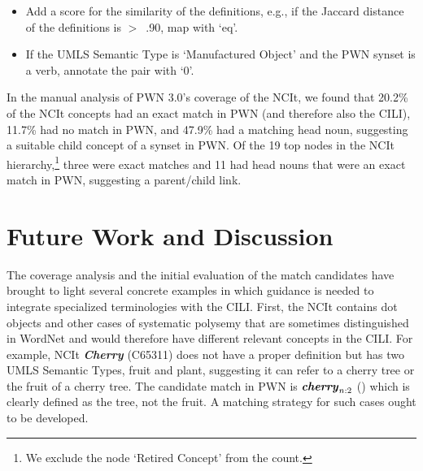 \documentclass[11pt]{article}
\newcommand{\lex}[1]{\textbf{\textit{#1}}}
\begin{document}
\begin{itemize}
\item Add a score for the similarity of the definitions, e.g., if the Jaccard distance of the definitions is $>$~.90, map with `eq'.
\item If the UMLS Semantic Type is `Manufactured Object' and the PWN synset is a verb, annotate the pair with `0'.
\end{itemize}



In the manual analysis of PWN 3.0's coverage of the NCIt, we found that 20.2\% of the NCIt concepts had an exact match in PWN (and therefore also the CILI), 11.7\% had no match in PWN, and 47.9\% had a matching head noun, suggesting a suitable child concept of a synset in PWN.
Of the 19 top nodes in the NCIt hierarchy,\footnote{We exclude the node `Retired Concept' from the count.} three were exact matches and 11 had head nouns that were an exact match in PWN, suggesting a parent/child link.
 
 
\section{Future Work and Discussion}

The coverage analysis and the initial evaluation of the match candidates have brought to light several concrete examples in which guidance is needed to integrate specialized terminologies with the CILI. First, the NCIt contains dot objects and other cases of systematic polysemy that are sometimes distinguished in WordNet and would therefore have different relevant concepts in the CILI. For example, NCIt \lex{Cherry} (C65311) does not have a proper definition but has two UMLS Semantic Types, fruit and plant, suggesting it can refer to a cherry tree or the fruit of a cherry tree. The candidate match in PWN is $\lex{cherry}_{n:2}$ () %
which is clearly defined as the tree, not the fruit. A matching strategy for such cases ought to be developed.
\end{document}
